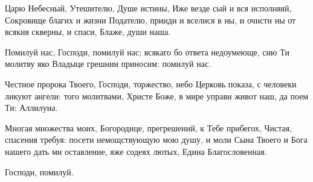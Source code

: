 \mychapterending

 
{\centering {}\par}

\begin{mymulticols}

\MolitvamiSviatyhOtecNashih 

Царю Небесный, Утешителю, Душе истины, Иже везде сый и вся исполняяй, Сокровище благих и жизни Подателю, прииди и вселися в ны, и очисти ны от всякия скверны, и спаси, Блаже, души наша.

\TrisviatoePoOtcheNash


Помилуй нас, Господи, помилуй нас; всякаго бо ответа недоумеюще, сию Ти молитву яко Владыце грешнии приносим: помилуй нас. 

\slavan

Честное пророка Твоего, Господи, торжество, небо Церковь показа, с человеки ликуют ангели: того молитвами, Христе Боже, в мире управи живот наш, да поем Ти: Аллилуиа. 

\inynen

Многая множества моих, Богородице, прегрешений, к Тебе прибегох, Чистая, спасения требуя: посети немощствующую мою душу, и моли Сына Твоего и Бога нашего дать ми оставление, яже содеях лютых, Едина Благословенная. 

Господи, помилуй. 


\priiditepoklonimsia




\end{mymulticols}
